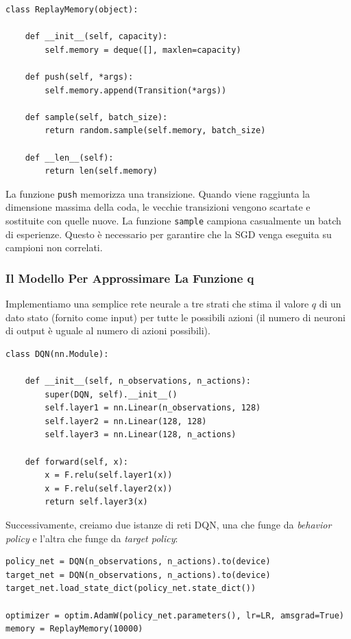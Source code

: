 ﻿\documentclass[11pt, a4paper]{report}
\begin{document}
\begin{verbatim}
class ReplayMemory(object):

    def __init__(self, capacity):
        self.memory = deque([], maxlen=capacity)

    def push(self, *args):
        self.memory.append(Transition(*args))

    def sample(self, batch_size):
        return random.sample(self.memory, batch_size)

    def __len__(self):
        return len(self.memory)
\end{verbatim}

La funzione \texttt{push} memorizza una transizione. Quando viene raggiunta la dimensione massima della coda, le vecchie transizioni vengono scartate e sostituite con quelle nuove. La funzione \texttt{sample} campiona casualmente un batch di esperienze. Questo è necessario per garantire che la SGD venga eseguita su campioni non correlati.

\subsubsection{Il Modello Per Approssimare La Funzione q}
Implementiamo una semplice rete neurale a tre strati che stima il valore $q$ di un dato stato (fornito come input) per tutte le possibili azioni (il numero di neuroni di output è uguale al numero di azioni possibili).

\begin{verbatim}
class DQN(nn.Module):

    def __init__(self, n_observations, n_actions):
        super(DQN, self).__init__()
        self.layer1 = nn.Linear(n_observations, 128)
        self.layer2 = nn.Linear(128, 128)
        self.layer3 = nn.Linear(128, n_actions)

    def forward(self, x):
        x = F.relu(self.layer1(x))
        x = F.relu(self.layer2(x))
        return self.layer3(x)
\end{verbatim}

Successivamente, creiamo due istanze di reti DQN, una che funge da \emph{behavior policy} e l'altra che funge da \emph{target policy}:

\begin{verbatim}
policy_net = DQN(n_observations, n_actions).to(device)
target_net = DQN(n_observations, n_actions).to(device)
target_net.load_state_dict(policy_net.state_dict())

optimizer = optim.AdamW(policy_net.parameters(), lr=LR, amsgrad=True)
memory = ReplayMemory(10000)
\end{verbatim}
\end{document}
